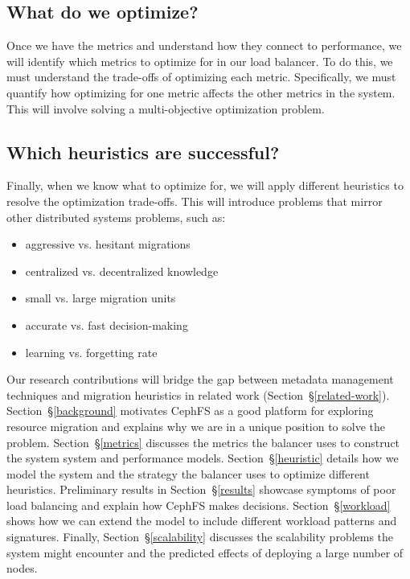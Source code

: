 \subsection*{What do we optimize?}
Once we have the metrics and understand how they connect to performance, we will identify which metrics to optimize for in our load balancer. To do this, we must understand the trade-offs of optimizing each metric. Specifically, we must quantify how optimizing for one metric affects the other metrics in the system. This will involve solving a multi-objective optimization problem. 

\subsection*{Which heuristics are successful?}
Finally, when we know what to optimize for, we will apply different heuristics to resolve the optimization trade-offs. This will introduce problems that mirror other distributed systems problems, such as:
\begin{itemize}
	\item aggressive vs. hesitant migrations	
	\item centralized vs. decentralized knowledge
	\item small vs. large migration units
	\item accurate vs. fast decision-making
	\item learning vs. forgetting rate
\end{itemize}

Our research contributions will bridge the gap between metadata management techniques and migration heuristics in related work (Section~\S\ref{related-work}). Section~\S\ref{background} motivates CephFS as a good platform for exploring resource migration and explains why we are in a unique position to solve the problem. Section~\S\ref{metrics} discusses the metrics the balancer uses to construct the system system and performance models. Section~\S\ref{heuristic} details how we model the system and the strategy the balancer uses to optimize different heuristics. Preliminary results in Section~\S\ref{results} showcase symptoms of poor load balancing and explain how CephFS makes decisions. Section~\S\ref{workload} shows how we can extend the model to include different workload patterns and signatures. Finally, Section~\S\ref{scalability} discusses the scalability problems the system might encounter and the predicted effects of deploying a large number of nodes. 

